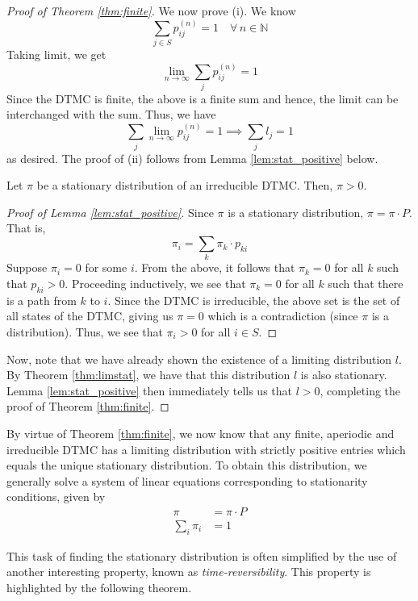 \documentclass[12pt]{article}
\theoremstyle{definition}
\begin{document}
\begin{proof}[Proof of Theorem \ref{thm:finite}]
    We now prove (i). We know
    \[
        \sum_{j \in S} p_{ij}^{(n)} = 1 \quad \forall \, n \in \mathbb{N}
    \]
    Taking limit, we get
    \[
        \lim_{n \to \infty} \sum_{j} p_{ij}^{(n)} = 1
    \]
    Since the DTMC is finite, the above is a finite sum and hence, the limit can be interchanged with the sum. Thus, we have
    \[
        \sum_{j} \lim_{n \to \infty} p_{ij}^{(n)} = 1 \implies \sum_j l_j = 1
    \]
    as desired. The proof of (ii) follows from Lemma \ref{lem:stat_positive} below. 

\begin{lem} \label{lem:stat_positive}
    Let $\pi$ be a stationary distribution of an irreducible DTMC. Then, $\pi > 0$.
\end{lem}

\begin{proof}[Proof of Lemma \ref{lem:stat_positive}]
    Since $\pi$ is a stationary distribution, $\pi = \pi \cdot P$. That is,
    \[
        \pi_i = \sum_k \pi_k \cdot p_{ki}
    \]
    Suppose $\pi_i = 0$ for some $i$. From the above, it follows that $\pi_k = 0$ for all $k$ such that $p_{ki} > 0$. Proceeding inductively, we see that $\pi_k = 0$ for all $k$ such that there is a path from $k$ to $i$. Since the DTMC is irreducible, the above set is the set of all states of the DTMC, giving us $\pi = 0$ which is a contradiction (since $\pi$ is a distribution). Thus, we see that $\pi_i > 0$ for all $i \in S$.
\end{proof}


Now, note that we have already shown the existence of a limiting distribution $l$. By Theorem \ref{thm:limstat}, we have that this distribution $l$ is also stationary. Lemma \ref{lem:stat_positive} then immediately tells us that $l > 0$, completing the proof of Theorem \ref{thm:finite}.
\end{proof}

By virtue of Theorem \ref{thm:finite}, we now know that any finite, aperiodic and irreducible DTMC has a limiting distribution with strictly positive entries which equals the unique stationary distribution. To obtain this distribution, we generally solve a system of linear equations corresponding to stationarity conditions, given by
\begin{align*}
    \pi &= \pi \cdot P \\
    \sum_i \pi_i &= 1
\end{align*}

This task of finding the stationary distribution is often simplified by the use of another interesting property, known as \emph{time-reversibility}. This property is highlighted by the following theorem. 
\end{document}
